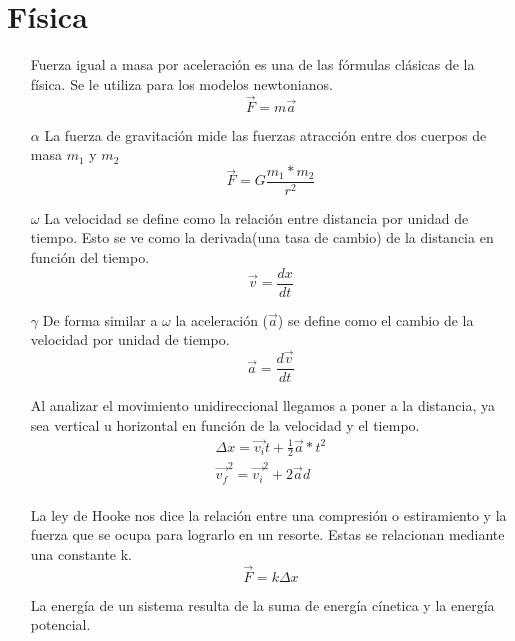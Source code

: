 \documentclass[letterpaper,global 12pt]{article}
\begin{document}
\section{Física}
\begin{itemize}\color{magenta}
    \item [\vdash] Fuerza igual a masa por aceleración es una de las fórmulas clásicas de la física. Se le utiliza para los modelos newtonianos.
    \begin{equation*}
        \Vec{F}=m\Vec{a}
    \end{equation*}\color{black}
    \item [$\alpha$] La fuerza de gravitación mide las fuerzas atracción entre dos cuerpos de masa $m_1$ y $m_2$
    \begin{equation*}
        \Vec{F}=G\frac{m_1*m_2}{r^2}
    \end{equation*}
    \item[$\omega$]La velocidad se define como la relación entre distancia por unidad de tiempo. Esto se ve como la derivada(una tasa de cambio) de la distancia en función del tiempo. 
    \begin{equation*}
        \Vec{v}=\frac{dx}{dt}
    \end{equation*}
    \item[$\gamma$]De forma similar a $\omega$ la aceleración ($\Vec{a}$) se define como el cambio de la velocidad por unidad de tiempo. 
    \begin{equation*}
        \Vec{a}=\frac{d\Vec{v}}{dt}
    \end{equation*}
    \item[\flat] Al analizar el movimiento unidireccional llegamos a poner a la distancia, ya sea vertical u horizontal en función de la velocidad y el tiempo. 
    \begin{align*}
        \Delta x= \Vec{v_i}t+\frac{1}{2}\Vec{a}*t^2\\
        \Vec{v_f}^2=\Vec{v_i}^2+2\Vec{a}d\\
    \end{align*}
    \item[\natural] La ley de Hooke nos dice la relación entre una compresión o estiramiento y la fuerza que se ocupa para lograrlo en un resorte. Estas se relacionan mediante una constante k. 
    \begin{equation*}
        \Vec{F}=k\Delta x
    \end{equation*}
    \item[\sharp] La energía de un sistema resulta de la suma de energía cínetica y la energía potencial.

\end{itemize}
\end{document}

